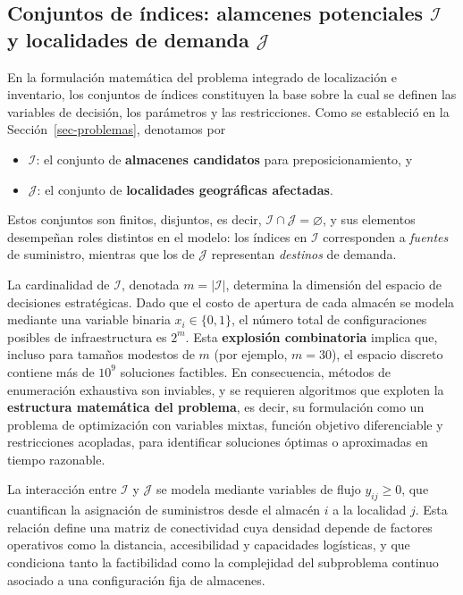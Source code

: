 \documentclass[
  spanish,
  us-letterpaper,
]{scrreprt}
\providecommand{\tightlist}{%
  \setlength{\itemsep}{0pt}\setlength{\parskip}{0pt}}
\numberwithin{equation}{section}
\begin{document}
\subsection{\texorpdfstring{Conjuntos de índices: alamcenes potenciales
\(\mathcal{I}\) y localidades de demanda
\(\mathcal{J}\)}{Conjuntos de índices: alamcenes potenciales \textbackslash mathcal\{I\} y localidades de demanda \textbackslash mathcal\{J\}}}\label{conjuntos-de-uxedndices-alamcenes-potenciales-mathcali-y-localidades-de-demanda-mathcalj}

En la formulación matemática del problema integrado de localización e
inventario, los conjuntos de índices constituyen la base sobre la cual
se definen las variables de decisión, los parámetros y las
restricciones. Como se estableció en la Sección~\ref{sec-problemas},
denotamos por

\begin{itemize}
\tightlist
\item
  \(\mathcal{I}\): el conjunto de \textbf{almacenes candidatos} para
  preposicionamiento, y\\
\item
  \(\mathcal{J}\): el conjunto de \textbf{localidades geográficas
  afectadas}.
\end{itemize}

Estos conjuntos son finitos, disjuntos, es decir,
\(\mathcal{I} \cap \mathcal{J} = \varnothing\), y sus elementos
desempeñan roles distintos en el modelo: los índices en \(\mathcal{I}\)
corresponden a \emph{fuentes} de suministro, mientras que los de
\(\mathcal{J}\) representan \emph{destinos} de demanda.

La cardinalidad de \(\mathcal{I}\), denotada \(m = |\mathcal{I}|\),
determina la dimensión del espacio de decisiones estratégicas. Dado que
el costo de apertura de cada almacén se modela mediante una variable
binaria \(x_i \in \{0,1\}\), el número total de configuraciones posibles
de infraestructura es \(2^m\). Esta \textbf{explosión combinatoria}
implica que, incluso para tamaños modestos de \(m\) (por ejemplo,
\(m = 30\)), el espacio discreto contiene más de \(10^9\) soluciones
factibles. En consecuencia, métodos de enumeración exhaustiva son
inviables, y se requieren algoritmos que exploten la \textbf{estructura
matemática del problema}, es decir, su formulación como un problema de
optimización con variables mixtas, función objetivo diferenciable y
restricciones acopladas, para identificar soluciones óptimas o
aproximadas en tiempo razonable.

La interacción entre \(\mathcal{I}\) y \(\mathcal{J}\) se modela
mediante variables de flujo \(y_{ij} \geq 0\), que cuantifican la
asignación de suministros desde el almacén \(i\) a la localidad \(j\).
Esta relación define una matriz de conectividad cuya densidad depende de
factores operativos como la distancia, accesibilidad y capacidades
logísticas, y que condiciona tanto la factibilidad como la complejidad
del subproblema continuo asociado a una configuración fija de almacenes.
\end{document}

